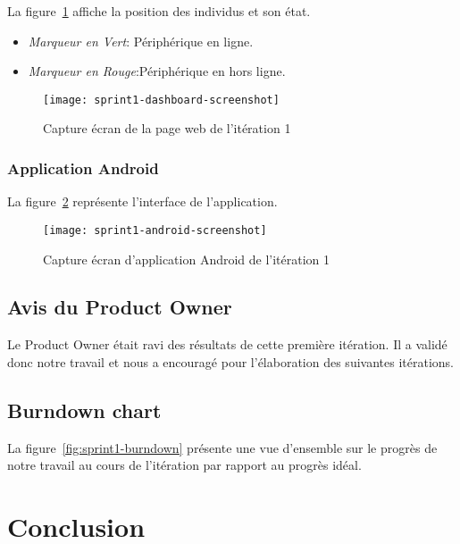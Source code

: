 La figure~\ref{fig:sprint1-dashboard-screenshot} affiche la position des
individus et son état.

\begin{itemize}
    \item \textit{Marqueur en Vert}: Périphérique en ligne.
    \item \textit{Marqueur en Rouge}:Périphérique en hors ligne.
\end{itemize}

\begin{figure}[htbp]
    \centering
    \texttt{[image: sprint1-dashboard-screenshot]}
    \caption{Capture écran de la page web de l'itération 1}
    \label{fig:sprint1-dashboard-screenshot}
\end{figure}

\subsubsection{Application Android}

La figure~\ref{fig:sprint1-android-screenshot} représente l'interface de
l'application.

\begin{figure}[htbp]
    \centering
    \texttt{[image: sprint1-android-screenshot]}
    \caption{Capture écran d'application Android de l'itération 1}
    \label{fig:sprint1-android-screenshot}
\end{figure}

\subsection{Avis du Product Owner}

Le Product Owner était ravi des résultats de cette première itération. Il a
validé donc notre travail et nous a encouragé pour l'élaboration des suivantes
itérations.

\subsection{Burndown chart}

La figure~\ref{fig:sprint1-burndown} présente une vue d'ensemble sur le progrès
de notre travail au cours de l'itération par rapport au progrès idéal.



\section*{Conclusion}

